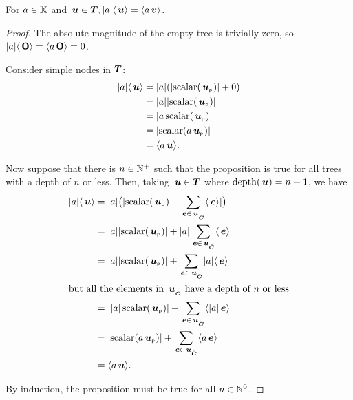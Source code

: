 \begin{proposition}\label{absolutehomogeneity}
  For $a \in \FIELD$ and $\node{u} \in \DOM, \abs{a}\nabs{\node{u}} =
  \nabs{a \node{v}}$.
  \begin{proof}
    The absolute magnitude of the empty tree is trivially zero, so $\abs{a}\nabs{\zerotree} =
    \nabs{a\zerotree} = 0$.

    Consider simple nodes in $\DOM$:
    \begin{align*}
      \abs{a}\nabs{\node{u}} &= \abs{a}(\abs{\scalar(\nlabel{u})} + 0) \\
      &= \abs{a}\abs{\scalar(\nlabel{u})} \\
      &= \abs{a\scalar(\nlabel{u})} \\
      &= \abs{\scalar(a\nlabel{u})} \\
      &= \nabs{a \node{u}}.
    \end{align*}

    Now suppose that there is $n \in \BBNI$ such that the proposition is true for
    all trees with a depth of $n$ or less. Then, taking $\node{u} \in
    \DOM$ where $\depth(\node{u}) = n+1$, we have
    \begin{align*}
      \abs{a}\nabs{\node{u}} &= \abs{a}\bigl(\abs{\scalar(\nlabel{u}) + \sum_{\node{e}\in\child{u}}\nabs{\node{e}}}\bigr) \\
      &= \abs{a}\abs{\scalar(\nlabel{u})} + \abs{a}\sum_{\node{e}\in\child{u}}\nabs{\node{e}}\\
      &= \abs{a}\abs{\scalar(\nlabel{u})} + \sum_{\node{e}\in\child{u}}\abs{a}\nabs{\node{e}}\\
      \intertext{but all the elements in $\child{u}$ have a depth of $n$ or less}
      &= \abs{\abs{a}\scalar(\nlabel{u})} + \sum_{\node{e}\in\child{u}}\nabs{\abs{a}\node{e}} \\
      &= \abs{\scalar(a\nlabel{u})} + \sum_{\node{e}\in\child{u}}\nabs{a \node{e}} \\
      &= \nabs{a \node{u}}.
    \end{align*}

    By induction, the proposition must be true for all $n \in \BBNO$.
  \end{proof}
\end{proposition}

